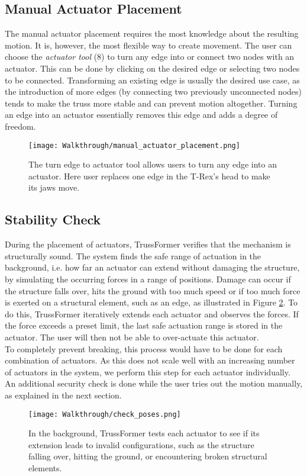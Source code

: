 \subsection{Manual Actuator Placement}
The manual actuator placement requires the most knowledge about the resulting motion. It is, however, the most flexible way to create movement. The user can choose the \textit{actuator tool} (8) to turn any edge into or connect two nodes with an actuator. This can be done by clicking on the desired edge or selecting two nodes to be connected. Transforming an existing edge is usually the desired use case, as the introduction of more edges (by connecting two previously unconnected nodes) tends to make the truss more stable and can prevent motion altogether. Turning an edge into an actuator essentially removes this edge and adds a degree of freedom.
\begin{figure}[ht!]
    \texttt{[image: Walkthrough/manual\_actuator\_placement.png]}
    \centering
    \caption{The turn edge to actuator tool allows users to turn any edge into an actuator. Here user replaces one edge in the T-Rex’s head to make its jaws move.}
    \label{fig:manual_actuator}
\end{figure}

\subsection{Stability Check}
During the placement of actuators, TrussFormer verifies that the mechanism is structurally sound. The system finds the safe range of actuation in the background, i.e. how far an actuator can extend without damaging the structure, by simulating the occurring forces in a range of positions. Damage can occur if the structure falls over, hits the ground with too much speed or if too much force is exerted on a structural element, such as an edge, as illustrated in Figure \ref{fig:check_poses}. To do this, TrussFormer iteratively extends each actuator and observes the forces. If the force exceeds a preset limit, the last safe actuation range is stored in the actuator. The user will then not be able to over-actuate this actuator.\\
To completely prevent breaking, this process would have to be done for each combination of actuators. As this does not scale well with an increasing number of actuators in the system, we perform this step for each actuator individually. An additional security check is done while the user tries out the motion manually, as explained in the next section.
\begin{figure}[ht!]
    \texttt{[image: Walkthrough/check\_poses.png]}
    \centering
    \caption{In the background, TrussFormer tests each actuator to see if its extension leads to invalid configurations, such as the structure falling over, hitting the ground, or encountering broken structural elements.}
    \label{fig:check_poses}
\end{figure}

